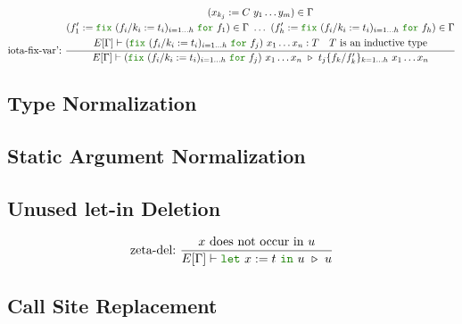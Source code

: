 \documentclass[a4paper,fleqn]{article}
\newcommand{\kwlet}{\mbox{\color{mygreen}\ttfamily let}}
\newcommand{\kwin}{\mbox{\color{mygreen}\ttfamily in}}
\newcommand{\kwfix}{\mbox{\color{mygreen}\ttfamily fix}}
\newcommand{\kwfor}{\mbox{\color{mygreen}\ttfamily for}}
\newcommand{\letin}[3]{\kwlet~#1:=#2~\kwin~#3}
\newcommand{\fix}[4]{\kwfix~(#1 := #2)_{#3}~\kwfor~#4}
\newcommand{\subst}[3]{#1\{#2/#3\}}
\begin{document}
\begin{gather*}
{    } \\
  \text{iota-fix-var':}~
    \dfrac
    {
      \begin{gathered}
        (x_{k_j} := C~y_1\ldots y_m) \in \Gamma \\
        (f'_1 := \fix{f_i/k_i}{t_i}{i=1\dots h}{f_1}) \in \Gamma ~\dots~
        (f'_h := \fix{f_i/k_i}{t_i}{i=1\dots h}{f_h}) \in \Gamma \\
        E[\Gamma] \vdash (\fix{f_i/k_i}{t_i}{i=1\dots h}{f_j})~x_1\ldots x_n : T \quad
        \text{$T$ is an inductive type}
      \end{gathered}
    }{
      E[\Gamma] \vdash
      (\fix{f_i/k_i}{t_i}{i=1\dots h}{f_j})~x_1\ldots x_n
      ~\triangleright~
      \subst{t_j}{f_k}{f'_k}_{k=1\dots h} ~x_1 \dots x_n
    }
\end{gather*}

\subsection{Type Normalization}\label{sec:type-normalization}
\subsection{Static Argument Normalization}\label{sec:static-argument-normalization}
\subsection{Unused let-in Deletion}\label{sec:let-in-deletion}
\begin{gather*}
  \text{zeta-del:}~
    \dfrac{
      \text{$x$ does not occur in $u$}
    }{E[\Gamma] \vdash \letin{x}{t}{u}
                       ~\triangleright~
                       u
    }
\end{gather*}

\subsection{Call Site Replacement}\label{sec:call-site-replacement}
\end{document}
